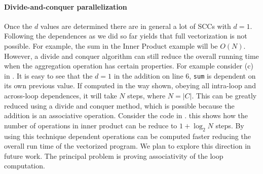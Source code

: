 \paragraph{Divide-and-conquer parallelization}
\label{sec:divideconquer}
Once the $d$ values are determined there are in general a lot of SCCs with $d=1$. 
Following the dependences as we did so far yields that full vectorization is not possible. For example, 
the sum in the Inner Product example will be $O(N)$. However, a divide and conquer 
algorithm can still reduce the overall running time when the aggregation operation has certain properties. 
For example consider (c) in .
It is easy to see that the $d = 1$ in the addition on line 6, \texttt{sum} is dependent on its own previous value. 
If computed in the way shown, obeying all intra-loop and across-loop dependences, it will take $N$ steps, where $N = \vert C \vert$. 
This can be greatly reduced using a divide and conquer method, which is possible because the addition is an associative
operation. Consider the code in .
this shows how the number of operations in inner product can be reduce to $1 + \log_2 N$ steps. %
By using this technique dependent operations can be computed
faster reducing the overall run time of the vectorized program. We plan to explore this direction in future work.
The principal problem is proving associativity of the loop computation.







